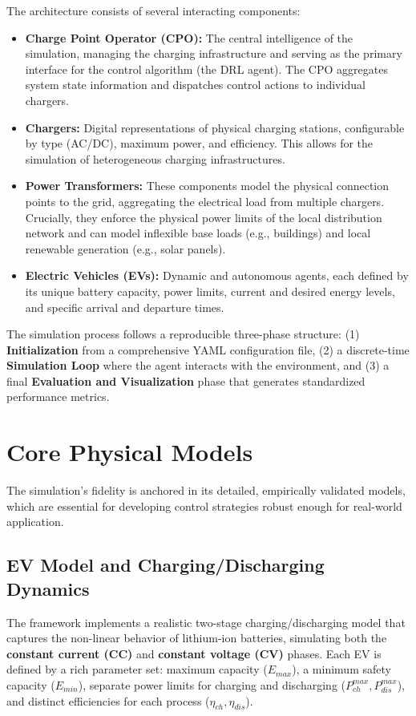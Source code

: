 The architecture consists of several interacting components:
\begin{itemize}
    \item \textbf{Charge Point Operator (CPO):} The central intelligence of the simulation, managing the charging infrastructure and serving as the primary interface for the control algorithm (the DRL agent). The CPO aggregates system state information and dispatches control actions to individual chargers.
    \item \textbf{Chargers:} Digital representations of physical charging stations, configurable by type (AC/DC), maximum power, and efficiency. This allows for the simulation of heterogeneous charging infrastructures.
    \item \textbf{Power Transformers:} These components model the physical connection points to the grid, aggregating the electrical load from multiple chargers. Crucially, they enforce the physical power limits of the local distribution network and can model inflexible base loads (e.g., buildings) and local renewable generation (e.g., solar panels).
    \item \textbf{Electric Vehicles (EVs):} Dynamic and autonomous agents, each defined by its unique battery capacity, power limits, current and desired energy levels, and specific arrival and departure times.
\end{itemize}
The simulation process follows a reproducible three-phase structure: (1) \textbf{Initialization} from a comprehensive YAML configuration file, (2) a discrete-time \textbf{Simulation Loop} where the agent interacts with the environment, and (3) a final \textbf{Evaluation and Visualization} phase that generates standardized performance metrics.

\section{Core Physical Models}
The simulation's fidelity is anchored in its detailed, empirically validated models, which are essential for developing control strategies robust enough for real-world application.

\subsection{EV Model and Charging/Discharging Dynamics}
The framework implements a realistic two-stage charging/discharging model that captures the non-linear behavior of lithium-ion batteries, simulating both the \textbf{constant current (CC)} and \textbf{constant voltage (CV)} phases. Each EV is defined by a rich parameter set: maximum capacity ($E_{max}$), a minimum safety capacity ($E_{min}$), separate power limits for charging and discharging ($P_{ch}^{max}, P_{dis}^{max}$), and distinct efficiencies for each process ($\eta_{ch}, \eta_{dis}$).

